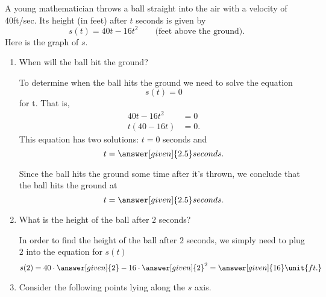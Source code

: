 \documentclass{ximera}
\begin{document}
\begin{example}
A young mathematician throws a ball straight into the air with 
a velocity of 40ft/sec. Its height (in feet) after $t$ seconds 
is given by
\[
s(t) = 40t-16t^2 \qquad\text{(feet above the ground)} .
\]
Here is the graph of $s$.
\begin{image}
\end{image}
\begin{enumerate}
\item When will the ball hit the ground?

\begin{explanation}
To determine when the ball hits the ground we need to solve the
equation
\[
s(t)=0
\]
for t.  That is,
\begin{align*}
40t-16t^2 &= 0\\
t(40-16t) &= 0.
\end{align*}
This  equation has two solutions: $t=0$
seconds and
 \[
 t=\answer[given]{2.5} seconds.
 \] 
 
   Since the ball hits
the ground  some time after it's
thrown, we conclude that the ball hits the ground at 
\[
t=\answer[given]{2.5}seconds.
\]
\end{explanation}


\item What is the height of the ball after $2$ seconds?

\begin{explanation}
In order to find the height of the ball after $2$ seconds, we simply need 
to plug $2$ into the equation for $s(t)$ 
\[
s(2) = 40\cdot\answer[given]{2} - 16\cdot\answer[given]{2}^2 = 
\answer[given]{16}\unit{ft.}
\]

\end{explanation}
\item Consider the following points lying along the $s$ axis.
\begin{image}
\end{image}
\end{enumerate}
\end{example}
\end{document}
